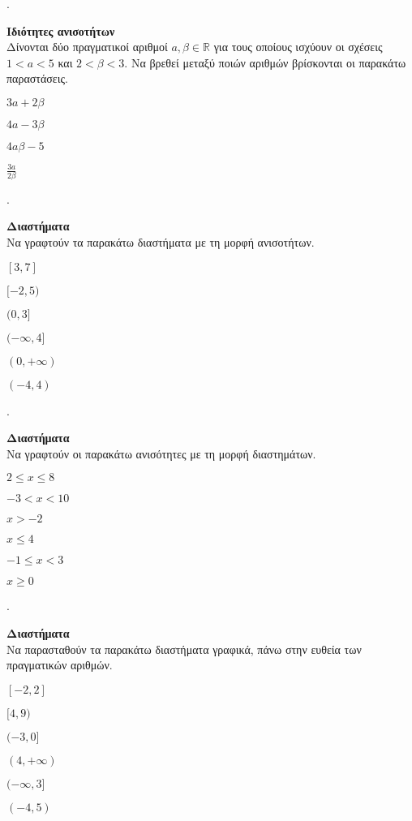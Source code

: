 \documentclass[11pt,a4paper,twocolumn]{article}
\newcounter{askhsh}
\newcommand{\askhsh}{\large\theaskhsh.\ \addtocounter{askhsh}{1}}
\begin{document}
\askhsh \textbf{Ιδιότητες ανισοτήτων}\\
Δίνονται δύο πραγματικοί αριθμοί $ a,\beta\in\mathbb{R} $ για τους οποίους ισχύουν οι σχέσεις $ 1<a<5 $ και $ 2<\beta<3 $. Να βρεθεί μεταξύ ποιών αριθμών βρίσκονται οι παρακάτω παραστάσεις.
\begin{multicols}{2}
\begin{rlist}
\item $ 3a+2\beta $
\item $ 4a-3\beta $
\item $ 4a\beta-5 $
\item $ \frac{3a}{2\beta} $
\end{rlist}
\end{multicols}
\askhsh \textbf{Διαστήματα}\\
Να γραφτούν τα παρακάτω διαστήματα με τη μορφή ανισοτήτων.
\begin{multicols}{3}
\begin{rlist}
\item $ [3,7] $
\item $ [-2,5) $
\item $ (0,3] $
\item $ (-\infty,4] $
\item $ (0,+\infty) $
\item $ (-4,4) $
\end{rlist}
\end{multicols}
\askhsh \textbf{Διαστήματα}\\
Να γραφτούν οι παρακάτω ανισότητες με τη μορφή διαστημάτων.
\begin{multicols}{2}
\begin{rlist}
\item $ 2\leq x\leq 8 $
\item $ -3<x<10 $
\item $ x>-2 $
\item $ x\leq 4 $
\item $ -1\leq x<3 $
\item $ x\geq 0 $
\end{rlist}
\end{multicols}
\askhsh \textbf{Διαστήματα}\\
Να παρασταθούν τα παρακάτω διαστήματα γραφικά, πάνω στην ευθεία των πραγματικών αριθμών.
\begin{multicols}{3}
\begin{rlist}[leftmargin=5mm]
\item $ [-2,2] $
\item $ [4,9) $
\item $ (-3,0] $
\item $ (4,+\infty) $
\item $ (-\infty,3] $
\item $ (-4,5) $
\end{rlist}
\end{multicols}
\end{document}
